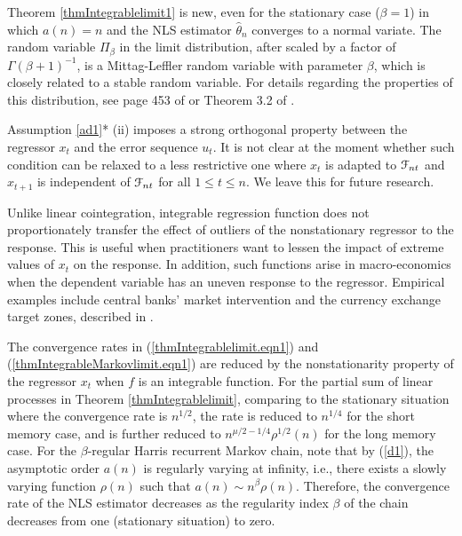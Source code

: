 \begin{rem}
Theorem \ref{thmIntegrablelimit1} is new, even for the stationary case ($\beta = 1$) in which $a(n) = n$ and the NLS estimator $\hat{\theta}_n$ converges to a normal variate. The random variable $\Pi_{\beta}$ in the limit distribution, after scaled by a factor of $\Gamma(\beta+1)^{-1}$, is a Mittag-Leffler random variable with parameter $\beta$, which is closely related to a stable random variable. For details regarding the properties of this distribution, see page 453 of \cite{feller1971} or Theorem 3.2 of \cite{karlsentjostheim2001}.
\end{rem}



\begin{rem} Assumption \ref{ad1}* (ii) imposes a strong orthogonal property between the regressor $x_t$ and the error sequence $u_t$. It is not clear at the moment whether such condition can be relaxed to a less restrictive one where $x_t$ is adapted to $\mathcal F_{nt}$ and $x_{t+1}$ is independent of $\mathcal F_{nt}$ for all $1 \le t \le n$. We leave this for future research.
\end{rem}

\begin{rem}
Unlike linear cointegration, integrable regression function does not proportionately transfer the effect of outliers of the nonstationary regressor to the response. This is useful when practitioners want to lessen the impact of extreme values of $x_t$ on the response. In addition, such functions arise in macro-economics when the dependent variable has an uneven response to the regressor. Empirical examples include central banks' market intervention and the currency exchange target zones, described in \cite{phillips2001}.
\end{rem}

\begin{rem}
The convergence rates in (\ref{thmIntegrablelimit.eqn1}) and (\ref{thmIntegrableMarkovlimit.eqn1}) are reduced by the nonstationarity property of the regressor $x_t$ when $f$ is an integrable function. For the partial sum of linear processes in Theorem \ref{thmIntegrablelimit}, comparing to the stationary situation where the convergence rate is $n^{1/2}$, the rate is reduced to $n^{1/4}$ for the short memory case, and is further reduced to $n^{\mu/2 - 1/4} \rho^{1/2}(n)$ for the long memory case. For the $\beta$-regular Harris recurrent Markov chain, note that by (\ref{d1}), the asymptotic order $a(n)$ is regularly varying at infinity, i.e., there exists a slowly varying function $\rho(n)$ such that $a(n) \sim  n^{\beta} \rho(n)$. Therefore, the convergence rate of the NLS estimator decreases as the regularity index $\beta$ of the chain decreases from one (stationary situation) to zero.
\end{rem}

